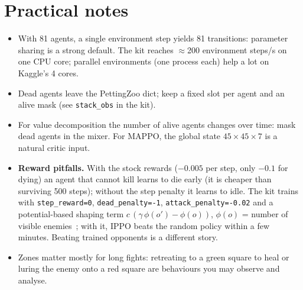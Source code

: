 \documentclass[11pt,a4paper]{article}
\newcommand{\code}[1]{\texttt{#1}}
\begin{document}
\section{Practical notes}
\begin{itemize}
  \item With 81 agents, a single environment step yields 81 transitions: parameter sharing
        is a strong default.  The kit reaches
        $\approx$200 environment steps/s on one CPU core; parallel environments (one
        process each) help a lot on Kaggle's 4 cores.
  \item Dead agents leave the PettingZoo dict; keep a fixed slot per agent and an alive mask
        (see \code{stack\_obs} in the kit).
  \item For value decomposition the number of alive agents changes over time: mask dead
        agents in the mixer.  For MAPPO, the global state $45\times45\times7$ is a natural
        critic input.
  \item \textbf{Reward pitfalls.}  With the stock rewards ($-0.005$ per step, only $-0.1$ for
        dying) an agent that cannot kill learns to die early (it is cheaper than surviving
        500 steps); without the step penalty it learns to idle.  The kit trains with
        \code{step\_reward=0}, \code{dead\_penalty=-1}, \code{attack\_penalty=-0.02} and a
        potential-based shaping term $c\,(\gamma\,\phi(o')-\phi(o))$, $\phi(o)$ = number of
        visible enemies~\cite{shaping}; with it, IPPO beats the random policy within a few
        minutes.  Beating trained opponents is a different story.
  \item Zones matter mostly for long fights: retreating to a green square to heal or
        luring the enemy onto a red square are behaviours you may observe and analyse.
\end{itemize}
\end{document}
